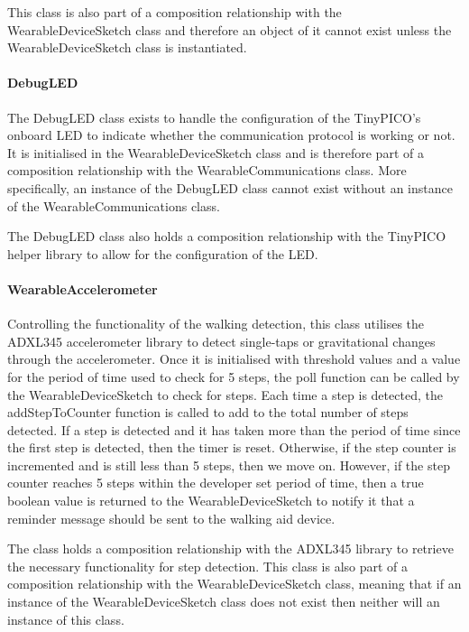                     This class is also part of a composition relationship with the WearableDeviceSketch class and therefore an object of it cannot exist unless the WearableDeviceSketch class is instantiated.

                \paragraph{DebugLED}\mbox{}

                    The DebugLED class exists to handle the configuration of the TinyPICO's onboard LED to indicate whether the communication protocol is working or not. It is initialised in the WearableDeviceSketch class and is therefore part of a composition relationship with the WearableCommunications class. More specifically, an instance of the DebugLED class cannot exist without an instance of the WearableCommunications class.

                    The DebugLED class also holds a composition relationship with the TinyPICO helper library to allow for the configuration of the LED.

                \paragraph{WearableAccelerometer}\mbox{}

                    Controlling the functionality of the walking detection, this class utilises the ADXL345 accelerometer library to detect single-taps or gravitational changes through the accelerometer. Once it is initialised with threshold values and a value for the period of time used to check for 5 steps, the poll function can be called by the WearableDeviceSketch to check for steps. Each time a step is detected, the addStepToCounter function is called to add to the total number of steps detected. If a step is detected and it has taken more than the period of time since the first step is detected, then the timer is reset. Otherwise, if the step counter is incremented and is still less than 5 steps, then we move on. However, if the step counter reaches 5 steps within the developer set period of time, then a true boolean value is returned to the WearableDeviceSketch to notify it that a reminder message should be sent to the walking aid device.

                    The class holds a composition relationship with the ADXL345 library to retrieve the necessary functionality for step detection. This class is also part of a composition relationship with the WearableDeviceSketch class, meaning that if an instance of the WearableDeviceSketch class does not exist then neither will an instance of this class. 

